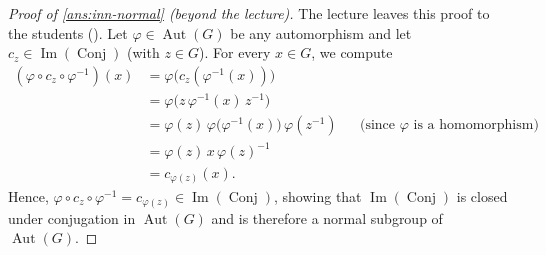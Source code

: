 \begin{content}


\begin{proof}[Proof of \cref{ans:inn-normal} (beyond the lecture)]
The lecture leaves this proof to the students (). Let $\varphi \in \operatorname{Aut}(G)$ be any automorphism and let $c_z \in \operatorname{Im}(\operatorname{Conj})$ (with $z \in G$). For every $x \in G$, we compute
\begin{align*}
(\varphi \circ c_z \circ \varphi^{-1})(x) &= \varphi\bigl(c_z(\varphi^{-1}(x))\bigr) \\
&= \varphi\bigl(z \, \varphi^{-1}(x) \, z^{-1}\bigr) \\
&= \varphi(z) \, \varphi\bigl(\varphi^{-1}(x)\bigr) \, \varphi(z^{-1}) && \text{(since $\varphi$ is a homomorphism)} \\
&= \varphi(z) \, x \, \varphi(z)^{-1} \\
&= c_{\varphi(z)}(x).
\end{align*}
Hence, $\varphi \circ c_z \circ \varphi^{-1} = c_{\varphi(z)} \in \operatorname{Im}(\operatorname{Conj})$, showing that $\operatorname{Im}(\operatorname{Conj})$ is closed under conjugation in $\operatorname{Aut}(G)$ and is therefore a normal subgroup of $\operatorname{Aut}(G)$.
\end{proof}
\end{content}

